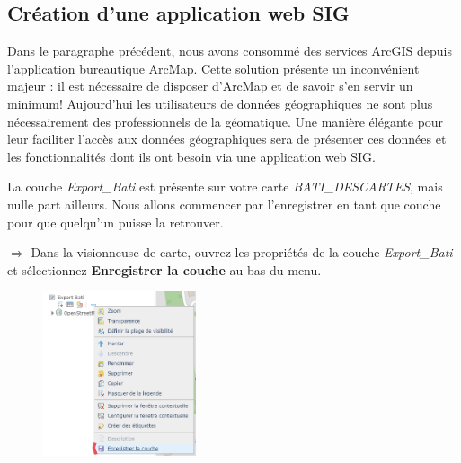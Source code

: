 \documentclass[11pt]{article}
\newcommand{\action}{$\Rightarrow$ }
\newcommand{\reponse}{
	\begin{tabbing}
	\hspace{2cm}\=\kill
	Réponse \> ............................................................................................ \\
 	\> ............................................................................................
	\end{tabbing}
}
\begin{document}
%
%
%
%
%
%
%
%


\subsection{Création d'une application web SIG}
Dans le paragraphe précédent, nous avons consommé des services ArcGIS depuis l'application bureautique ArcMap. Cette solution présente un inconvénient majeur : il est nécessaire de disposer d'ArcMap et de savoir s'en servir un minimum! Aujourd'hui les utilisateurs de données géographiques ne sont plus nécessairement des professionnels de la géomatique. Une manière élégante pour leur faciliter l'accès aux données géographiques sera de présenter ces données et les fonctionnalités dont ils ont besoin via une application web SIG.

La couche \textit{Export\_Bati} est présente sur votre carte \textit{BATI\_DESCARTES}, mais nulle part ailleurs. Nous allons commencer par l'enregistrer en tant que couche pour que quelqu'un puisse la retrouver.

\action Dans la visionneuse de carte, ouvrez les propriétés de la couche \textit{Export\_Bati} et sélectionnez \textbf{Enregistrer la couche} au bas du menu.
\begin{figure}[H]
	\center \includegraphics[width=0.4\textwidth]{img/cours3/ago_enregistrer_couche.png} \\
\end{figure}
\end{document}
